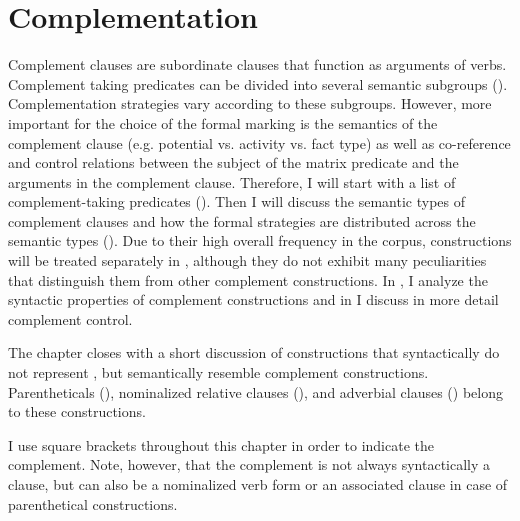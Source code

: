\chapter{Complementation}
\label{cpt:Complementation}

Complement clauses are subordinate clauses that function as arguments of verbs. Complement taking predicates can be divided into several semantic subgroups (). Complementation strategies vary according to these subgroups. However, more important for the choice of the formal marking is the semantics of the complement clause (e.g. potential vs. activity vs. fact type) as well as co-reference and control relations between the subject of the matrix predicate and the arguments in the complement clause. Therefore, I will start with a list of complement-taking predicates (). Then I will discuss the semantic types of complement clauses and how the formal strategies are distributed across the semantic types (). Due to their high overall frequency in the corpus,  constructions will be treated separately in , although they do not exhibit many peculiarities that distinguish them from other complement constructions. In , I analyze the syntactic properties of complement constructions and in  I discuss in more detail complement control. 

The chapter closes with a short discussion of constructions that syntactically do not represent , but semantically resemble complement constructions. Parentheticals (), nominalized relative clauses (), and adverbial clauses () belong to these constructions.

I use square brackets throughout this chapter in order to indicate the complement. Note, however, that the complement is not always syntactically a clause, but can also be a nominalized verb form or an associated clause in case of parenthetical constructions.



